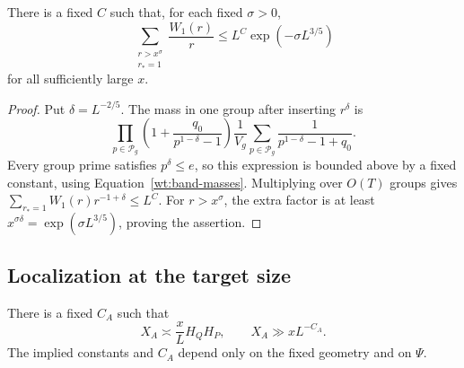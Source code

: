 \begin{lemma}\label{wt:tail}
There is a fixed $C$ such that, for each fixed $\sigma>0$,
\[
 \sum_{\substack{r>x^\sigma\\r_*=1}}\frac{W_1(r)}r
 \le L^C\exp(-\sigma L^{3/5})
\]
for all sufficiently large $x$.
\end{lemma}

\begin{proof}
Put $\delta=L^{-2/5}$. The mass in one group after inserting $r^\delta$
is
\[
 \prod_{p\in\mathcal P_g}
      \left(1+\frac{q_0}{p^{1-\delta}-1}\right)
 \frac1{V_g}\sum_{p\in\mathcal P_g}
      \frac1{p^{1-\delta}-1+q_0}.
\]
Every group prime satisfies $p^\delta\le e$, so this expression is
bounded above by a fixed constant, using Equation~\eqref{wt:band-masses}.
Multiplying over $O(T)$ groups gives
$\sum_{r_* =1}W_1(r)r^{-1+\delta}\le L^C$.
For $r>x^\sigma$, the extra factor is at least
$x^{\sigma\delta}=\exp(\sigma L^{3/5})$, proving the assertion.
\end{proof}

\subsection{Localization at the target size}

\begin{lemma}\label{wt:mass}
There is a fixed $C_A$ such that
\[
 X_A\asymp\frac{x}{L}H_QH_P,
 \qquad X_A\gg xL^{-C_A}.
\]
The implied constants and $C_A$ depend only on the fixed geometry and
on $\Psi$.
\end{lemma}

